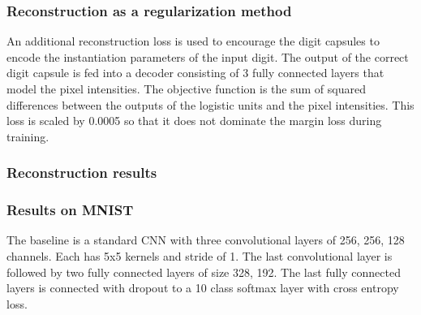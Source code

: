\documentclass{beamer}
\begin{document}
\begin{frame}
\frametitle{Reconstruction as a regularization method}
\begin{figure}
	\subcapcentertrue
    \centering
    \end{figure}
   
An additional reconstruction loss is used to encourage the digit capsules to encode the instantiation parameters of the input digit. The output of the correct digit capsule is fed into a decoder consisting of 3 fully connected layers that model the pixel intensities. The objective function is the sum of squared differences between the outputs of the logistic units and the pixel intensities. This loss is scaled by 0.0005 so that it does not dominate the margin loss during training.
\end{frame}

\begin{frame}
\frametitle{Reconstruction results}
\begin{figure}
	\subcapcentertrue
    \centering
    \end{figure}
\end{frame}

\begin{frame}
\frametitle{Results on MNIST}
\begin{figure}
	\subcapcentertrue
    \centering
    \end{figure}
The baseline is a standard CNN with three convolutional layers of 256, 256, 128 channels. Each has 5x5 kernels and stride of 1. The last convolutional layer is followed by two fully connected layers of size 328, 192. The last fully connected layers is connected with dropout to a 10 class softmax layer with cross entropy loss.
\end{frame}
\end{document}
